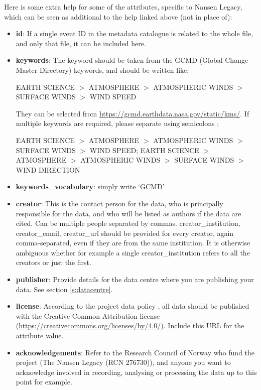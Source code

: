 \documentclass[a4paper,english, 11pt]{article}
\begin{document}
Here is some extra help for some of the attributes, specific to Nansen Legacy, which can be seen as additional to the help linked above (not in place of):
\begin{itemize}
\item \textbf{id}: If a single event ID in the metadata catalogue is related to the whole file, and only that file, it can be included here. 
\item \textbf{keywords}: The keyword should be taken from the GCMD (Global Change Master Directory) keywords, and should be written like:

EARTH SCIENCE $>$ ATMOSPHERE $>$ ATMOSPHERIC WINDS $>$ SURFACE WINDS $>$  WIND SPEED

They can be selected from \url{https://gcmd.earthdata.nasa.gov/static/kms/}.
If multiple keywords are required, please separate using semicolons ;

EARTH SCIENCE $>$ ATMOSPHERE $>$ ATMOSPHERIC WINDS $>$ SURFACE WINDS $>$  WIND SPEED; EARTH SCIENCE $>$ ATMOSPHERE $>$ ATMOSPHERIC WINDS $>$ SURFACE WINDS $>$  WIND DIRECTION

\item \textbf{keywords\_vocabulary}: simply write `GCMD'
\item \textbf{creator}: This is the contact person for the data, who is principally responsible for the data, and who will be listed as authors if the data are cited. Can be multiple people separated by commas. creator\_institution, creator\_email, creator\_url should be provided for every creator, again comma-separated, even if they are from the same institution. It is otherwise ambiguous whether for example a single creator\_institution refers to all the creators or just the first.  
\item \textbf{publisher}: Provide details for the data centre where you are publishing your data. See section \ref{s:datacentre}.
\item \textbf{license}: According to the project data policy \citep{aendatapolicy2021}, all data should be published with the Creative Common Attribution license (\url{https://creativecommons.org/licenses/by/4.0/}). Include this URL for the attribute value. 
\item \textbf{acknowledgements}: Refer to the Research Council of Norway who fund the project (The Nansen Legacy (RCN 276730)), and anyone you want to acknowledge involved in recording, analysing or processing the data up to this point for example.
\end{itemize}
\end{document}
